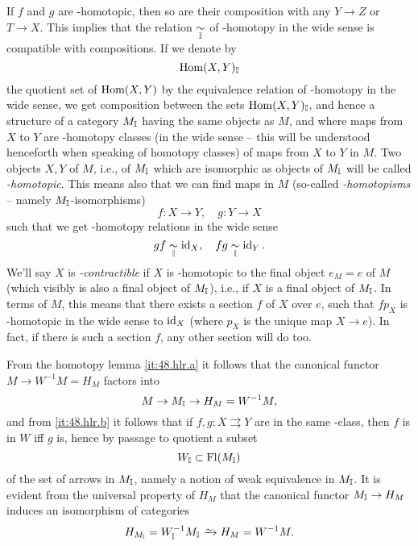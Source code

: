 If $f$ and $g$ are \bI-homotopic, then so are their composition with
any $Y\to Z$ or $T\to X$. This implies that the relation $\mathrel{\underset{{\mathbb{I}}}{\sim}}$ of
\bI-homotopy in the wide sense is compatible with compositions. If we
denote by
\[\operatorname{Hom}(X,Y)_{\mathbb{I}}\]
the quotient set of $\operatorname{Hom}(X,Y)$ by the equivalence relation of
\bI-homotopy in the wide sense, we get composition between the sets
$\operatorname{Hom}(X,Y)_{\mathbb{I}}$, and hence a structure of a category $M_{\mathbb{I}}$ having
the same objects as $M$, and where maps from $X$ to $Y$ are
\bI-homotopy classes (in the wide sense -- this will be understood
henceforth when speaking of homotopy classes) of maps from $X$ to $Y$
in $M$. Two objects $X,Y$ of $M$, i.e., of $M_{\mathbb{I}}$ which are
isomorphic as objects of $M_{\mathbb{I}}$ will be called
\emph{\bI-homotopic}. This means also that we can find maps in $M$
(so-called \emph{\bI-homotopisms } -- namely $M_{\mathbb{I}}$-isomorphisms)
\[ f:X\to Y, \quad g:Y\to X\]
such that we get \bI-homotopy relations in the wide sense
\[gf \mathrel{\underset{{\mathbb{I}}}{\sim}} \operatorname{id}_X,\quad fg \mathrel{\underset{{\mathbb{I}}}{\sim}}\operatorname{id}_Y.\]
We'll say $X$ is \emph{\bI-contractible} if $X$ is \bI-homotopic to
the final object $e_M=e$ of $M$ (which visibly is also a final object
of $M_{\mathbb{I}}$), i.e., if $X$ is a final object of $M_{\mathbb{I}}$. In terms of
$M$, this means that there exists a section $f$ of $X$ over $e$, such
that $fp_X$ is \bI-homotopic in the wide sense to $\operatorname{id}_X$ (where $p_X$
is the unique map $X\to e$). In fact, if there is such a section $f$,
any other section will do too.

From the homotopy lemma \ref{it:48.hlr.a} it follows that the canonical
functor $M\to W^{-1}M=H_M$ factors into
\[ M \to M_{\mathbb{I}} \to H_M = W^{-1}M,\]
and from \ref{it:48.hlr.b} it follows that if $f,g: X\rightrightarrows Y$
are in the same \bI-class, then $f$ is in $W$ if{f} $g$ is, hence by
passage to quotient a subset
\[ W_{\mathbb{I}} \subset \operatorname{Fl}(M_{\mathbb{I}})\]
of the set of arrows in $M_{\mathbb{I}}$, namely a notion of weak equivalence
in $M_{\mathbb{I}}$. It is evident from the universal property of $H_M$ that
the canonical functor $M_{\mathbb{I}}\to H_M$ induces an isomorphism of
categories
\[H_{M_\bI} = W_\bI^{-1}M_\bI \tosim H_M=W^{-1}M.\]

